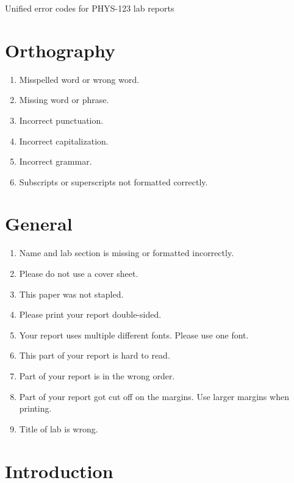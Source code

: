 \documentclass[12pt,letterpaper]{article}
\begin{document}
\begin{center}
  Unified error codes for PHYS-123 lab reports
\end{center}

\begin{multicols}{2}

\section{Orthography}

\begin{enumerate}[start=10]
  \item Misspelled word or wrong word.
  \item Missing word or phrase.
  \item Incorrect punctuation.
  \item Incorrect capitalization.
  \item Incorrect grammar.
  \item Subscripts or superscripts not formatted correctly.
\end{enumerate}

\section{General}

\begin{enumerate}[start=20]
  \item Name and lab section is missing or formatted incorrectly.
  \item Please do not use a cover sheet.
  \item This paper was not stapled.
  \item Please print your report double-sided.
  \item Your report uses multiple different fonts. Please use one font.
  \item This part of your report is hard to read.
  \item Part of your report is in the wrong order.
  \item Part of your report got cut off on the margins.
    Use larger margins when printing.
  \item Title of lab is wrong.
\end{enumerate}

\section{Introduction}


\end{multicols}
\end{document}
